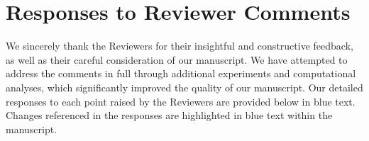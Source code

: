 \section*{Responses to Reviewer Comments}

We sincerely thank the Reviewers for their insightful and constructive feedback, as well as their careful consideration of our manuscript. We have attempted to address the comments in full through additional experiments and computational analyses, which significantly improved the quality of our manuscript. Our detailed responses to each point raised by the Reviewers are provided below in blue text. Changes referenced in the responses are highlighted in blue text within the manuscript.



